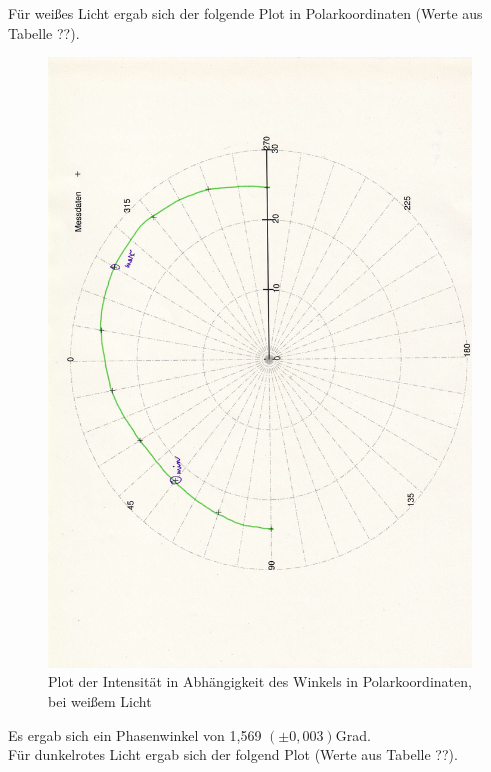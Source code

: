 \documentclass[12pt]{scrartcl}
\begin{document}
Für weißes Licht ergab sich der folgende Plot in Polarkoordinaten (Werte aus Tabelle ??).

\begin{figure}[H]
\centering
    \includegraphics[scale = 0.3, angle = -90]{a_5_w.pdf}
  	\caption[Plot der Intensität in Abhängigkeit des Winkels in Polarkoordinaten, bei weißem Licht]{Plot der Intensität in Abhängigkeit des Winkels in Polarkoordinaten, bei weißem Licht}
  \label{fig:a_5_w}
\end{figure}

Es ergab sich ein Phasenwinkel von 1,569 $(\pm 0,003)$Grad.\\

Für dunkelrotes Licht ergab sich der folgend Plot (Werte aus Tabelle ??).
\end{document}
